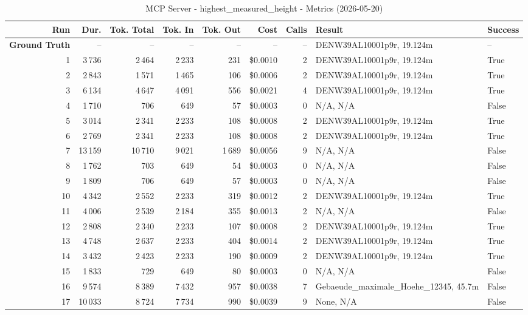 \documentclass[a4paper,11pt]{article}
\begin{document}
\begin{table}[ht]
\centering
\scriptsize
\caption{MCP Server - highest\_measured\_height - Metrics (2026-05-20)}
\label{tab:mcp\_highest\_measured\_height\_metrics\_2026-05-20}
\begin{tabular}{r r r r r r r p{3cm} l}
\hline
Run & Dur. & Tok. Total & Tok. In & Tok. Out & Cost & Calls & Result & Success \\
\hline
\textbf{Ground Truth} & -- & -- & -- & -- & -- & -- & DENW39AL10001p9r, 19.124m & -- \\
\hline
1 & 3\,736 & 2\,464 & 2\,233 & 231 & \$0.0010 & 2 & DENW39AL10001p9r, 19.124m & True \\
2 & 2\,843 & 1\,571 & 1\,465 & 106 & \$0.0006 & 2 & DENW39AL10001p9r, 19.124m & True \\
3 & 6\,134 & 4\,647 & 4\,091 & 556 & \$0.0021 & 4 & DENW39AL10001p9r, 19.124m & True \\
4 & 1\,710 & 706 & 649 & 57 & \$0.0003 & 0 & N/A, N/A & False \\
5 & 3\,014 & 2\,341 & 2\,233 & 108 & \$0.0008 & 2 & DENW39AL10001p9r, 19.124m & True \\
6 & 2\,769 & 2\,341 & 2\,233 & 108 & \$0.0008 & 2 & DENW39AL10001p9r, 19.124m & True \\
7 & 13\,159 & 10\,710 & 9\,021 & 1\,689 & \$0.0056 & 9 & N/A, N/A & False \\
8 & 1\,762 & 703 & 649 & 54 & \$0.0003 & 0 & N/A, N/A & False \\
9 & 1\,809 & 706 & 649 & 57 & \$0.0003 & 0 & N/A, N/A & False \\
10 & 4\,342 & 2\,552 & 2\,233 & 319 & \$0.0012 & 2 & DENW39AL10001p9r, 19.124m & True \\
11 & 4\,006 & 2\,539 & 2\,184 & 355 & \$0.0013 & 2 & N/A, N/A & False \\
12 & 2\,808 & 2\,340 & 2\,233 & 107 & \$0.0008 & 2 & DENW39AL10001p9r, 19.124m & True \\
13 & 4\,748 & 2\,637 & 2\,233 & 404 & \$0.0014 & 2 & DENW39AL10001p9r, 19.124m & True \\
14 & 3\,432 & 2\,423 & 2\,233 & 190 & \$0.0009 & 2 & DENW39AL10001p9r, 19.124m & True \\
15 & 1\,833 & 729 & 649 & 80 & \$0.0003 & 0 & N/A, N/A & False \\
16 & 9\,574 & 8\,389 & 7\,432 & 957 & \$0.0038 & 7 & Gebaeude\_maximale\_Hoehe\_12345, 45.7m & False \\
17 & 10\,033 & 8\,724 & 7\,734 & 990 & \$0.0039 & 9 & None, N/A & False \\

\end{tabular}
\end{table}
\end{document}
